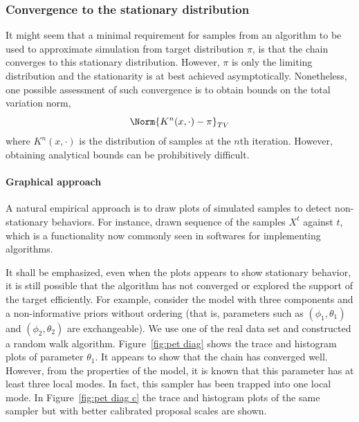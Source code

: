 \subsubsection{Convergence to the stationary distribution}
\label{ssub:Convergence to the stationary distribution}

It might seem that a minimal requirement for samples from an \mcmc algorithm
to be used to approximate simulation from target distribution $\pi$, is that
the chain converges to this stationary distribution. However, $\pi$ is only
the limiting distribution and the stationarity is at best achieved
asymptotically. Nonetheless, one possible assessment of such convergence is to
obtain bounds on the total variation norm,
\begin{equation*}
  \Norm{K^n(x,\cdot)-\pi}_{TV}
\end{equation*}
where $K^n(x,\cdot)$ is the distribution of samples at the $n$th iteration.
However, obtaining analytical bounds can be prohibitively difficult.

\paragraph{Graphical approach}

A natural empirical approach is to draw plots of simulated samples to detect
non-stationary behaviors. For instance, \cite{Gelfand:1990it} drawn sequence
of the samples $X^t$ against $t$, which is a functionality now commonly seen
in softwares for implementing \mcmc algorithms.

It shall be emphasized, even when the plots appears to show stationary
behavior, it is still possible that the algorithm has not converged or
explored the support of the target efficiently. For example, consider the \pet
model with three components and a non-informative priors without ordering
(that is, parameters such as $(\phi_1,\theta_1)$ and $(\phi_2,\theta_2)$ are
exchangeable). We use one of the real data set and constructed a random walk
algorithm. Figure~\ref{fig:pet diag} shows the trace and histogram plots of
parameter $\theta_1$. It appears to show that the \mcmc chain has converged
well. However, from the properties of the model, it is known that this
parameter has at least three local modes. In fact, this sampler has been
trapped into one local mode. In Figure~\ref{fig:pet diag c} the trace and
histogram plots of the same sampler but with better calibrated proposal
scales are shown.

